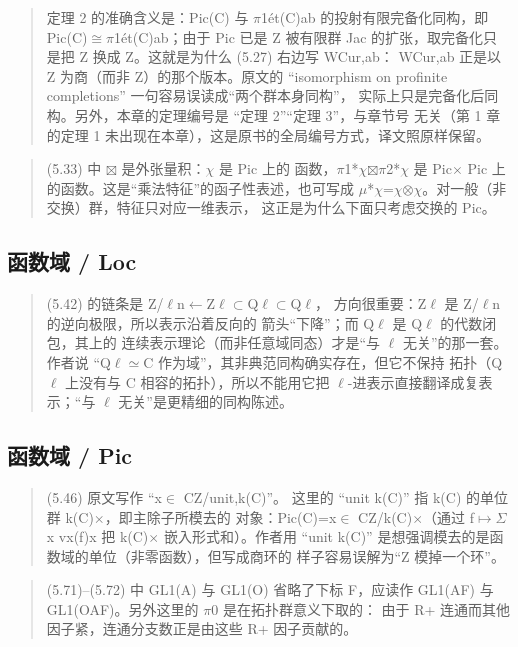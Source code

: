\begin{quote}\small
定理 2 的准确含义是：Pic(C) 与 $\pi$1ét(C)ab 的投射有限完备化同构，即 Pic(C)$\cong$$\pi$1ét(C)ab；由于 Pic 已是 Z 被有限群 Jac 的扩张，取完备化只是把 Z 换成 Z。这就是为什么 (5.27) 右边写 WCur,ab： WCur,ab 正是以 Z 为商（而非 Z）的那个版本。原文的 “isomorphism on profinite completions” 一句容易误读成“两个群本身同构”， 实际上只是完备化后同构。另外，本章的定理编号是 “定理 2”“定理 3”，与章节号 无关（第 1 章的定理 1 未出现在本章），这是原书的全局编号方式，译文照原样保留。
\end{quote}

\begin{quote}\small
(5.33) 中 $\boxtimes$ 是外张量积：$\chi$ 是 Pic 上的 函数，$\pi$1*$\chi$$\boxtimes$$\pi$2*$\chi$ 是 Pic$\times$ Pic 上的函数。这是“乘法特征”的函子性表述，也可写成 $\mu$*$\chi$=$\chi$$\otimes$$\chi$。对一般（非交换）群，特征只对应一维表示， 这正是为什么下面只考虑交换的 Pic。
\end{quote}

\subsection*{函数域 / Loc}
\begin{quote}\small
(5.42) 的链条是 Z/$\ell$n$\leftarrow$Z$\ell$$\subset$Q$\ell$$\subset$Q$\ell$， 方向很重要：Z$\ell$ 是 Z/$\ell$n 的逆向极限，所以表示沿着反向的 箭头“下降”；而 Q$\ell$ 是 Q$\ell$ 的代数闭包，其上的 连续表示理论（而非任意域同态）才是“与 $\ell$ 无关”的那一套。作者说 “Q$\ell$$\simeq$C 作为域”，其非典范同构确实存在，但它不保持 拓扑（Q$\ell$ 上没有与 C 相容的拓扑），所以不能用它把 $\ell$-进表示直接翻译成复表示；“与 $\ell$ 无关”是更精细的同构陈述。
\end{quote}

\subsection*{函数域 / Pic}
\begin{quote}\small
(5.46) 原文写作 “x$\in$ CZ/unit,k(C)”。 这里的 “unit k(C)” 指 k(C) 的单位群 k(C)$\times$，即主除子所模去的 对象：Pic(C)=x$\in$ CZ/k(C)$\times$（通过 f$\mapsto$$\Sigma$x vx(f)x 把 k(C)$\times$ 嵌入形式和）。作者用 “unit k(C)” 是想强调模去的是函数域的单位（非零函数），但写成商环的 样子容易误解为“Z 模掉一个环”。
\end{quote}

\begin{quote}\small
(5.71)--(5.72) 中 GL1(A) 与 GL1(O) 省略了下标 F，应读作 GL1(AF) 与 GL1(OAF)。另外这里的 $\pi$0 是在拓扑群意义下取的： 由于 R+ 连通而其他因子紧，连通分支数正是由这些 R+ 因子贡献的。
\end{quote}

